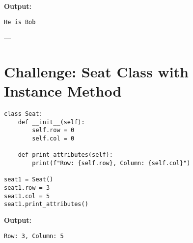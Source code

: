 \textbf{Output:}
\begin{verbatim}
He is Bob
\end{verbatim}

---

\section{Challenge: Seat Class with Instance Method}

\begin{verbatim}
class Seat:
    def __init__(self):
        self.row = 0
        self.col = 0

    def print_attributes(self):
        print(f"Row: {self.row}, Column: {self.col}")

seat1 = Seat()
seat1.row = 3
seat1.col = 5
seat1.print_attributes()
\end{verbatim}

\textbf{Output:}
\begin{verbatim}
Row: 3, Column: 5
\end{verbatim}

